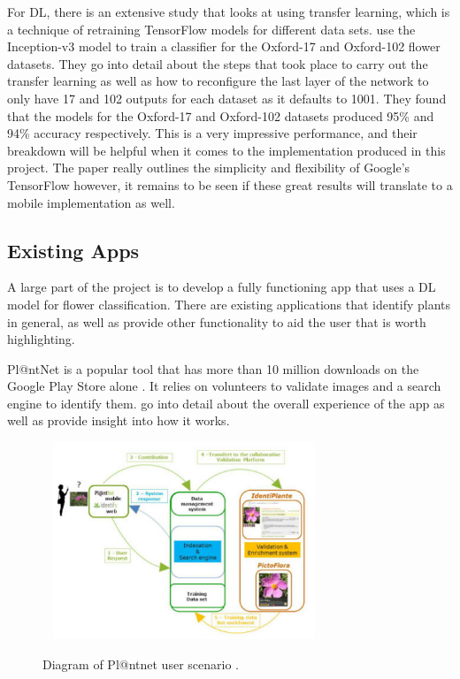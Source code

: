 \documentclass[12pt,a4paper]{report}
\begin{document}
For DL, there is an extensive study that looks at using transfer learning, which is a technique of retraining
TensorFlow models for different data sets. \citet{Xia2017} use the Inception-v3 model to train a classifier for 
the Oxford-17 and Oxford-102 flower datasets. They go into detail about the steps that took place to carry out the 
transfer learning as well as how to reconfigure the last layer of the network to only have 17 and 102 outputs for each 
dataset as it defaults to 1001. They found that the models for the Oxford-17 and Oxford-102 datasets 
produced 95\% and 94\% accuracy respectively. This is a very impressive performance, and their breakdown will be helpful 
when it comes to the implementation produced in this project. 
The paper really outlines the simplicity and flexibility of Google's 
TensorFlow however, it remains to be seen if these great results will translate to a mobile implementation 
as well.

\subsection{Existing Apps}

A large part of the project is to develop a fully functioning app that uses a
DL model for flower classification. There are existing applications that identify plants in general, as well as
provide other functionality to aid the user that is worth highlighting.

\par

Pl@ntNet is a popular tool that has more than 10 million downloads on the Google Play Store alone \citep{googleplay}. 
It relies on volunteers to validate images and a search engine to identify them. \citet{joly:hal-01182775}
go into detail about the overall experience of the app as well as provide insight into how it works.

\begin{figure}[h]\
    \centering
    \includegraphics[width=0.7\textwidth]{plantnet.png}
    \caption{Diagram of Pl@ntnet user scenario \citep{joly:hal-01182775}.}
    \label{fig:plantnet}
\end{figure}
\end{document}
